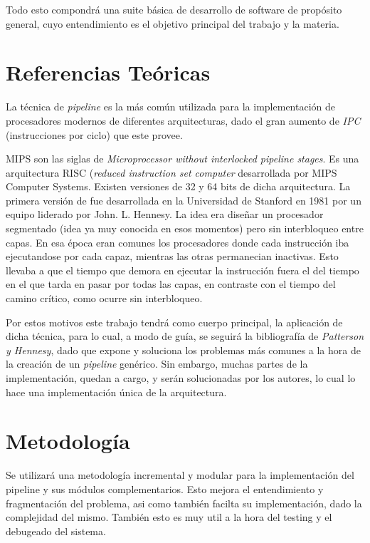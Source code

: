 \documentclass[12pt]{article}
\begin{document}
Todo esto compondrá una suite básica de desarrollo de software de propósito general, cuyo entendimiento es el objetivo principal del trabajo y la materia.


\section{Referencias Teóricas} \label{sec:firstpage}

La técnica de \textit{pipeline} es la más común utilizada para la implementación de procesadores modernos de diferentes arquitecturas, dado el gran aumento de \textit{IPC} (instrucciones por ciclo) que este provee.

MIPS son las siglas de \textit{Microprocessor without interlocked pipeline stages}. Es una arquitectura RISC (\textit{reduced instruction set computer} desarrollada por MIPS Computer Systems. Existen versiones de 32 y 64 bits de dicha arquitectura. La primera versión de fue desarrollada en la Universidad de Stanford en 1981 por un equipo liderado por John. L. Hennesy. La idea era diseñar un procesador segmentado (idea ya muy conocida en esos momentos) pero sin interbloqueo entre capas. En esa época eran comunes los procesadores donde cada instrucción iba ejecutandose por cada capaz, mientras las otras permanecian inactivas. Esto llevaba a que el tiempo que demora en ejecutar la instrucción fuera el del tiempo en el que tarda en pasar por todas las capas, en contraste con el tiempo del camino crítico, como ocurre sin interbloqueo.

Por estos motivos este trabajo tendrá como cuerpo principal, la aplicación de dicha técnica, para lo cual, a modo de guía, se seguirá la bibliografía de \textit{Patterson y Hennesy}, dado que expone y soluciona los problemas más comunes a la hora de la creación de un \textit{pipeline} genérico. Sin embargo, muchas partes de la implementación, quedan a cargo, y serán solucionadas por los autores, lo cual lo hace una implementación única de la arquitectura.

\section{Metodología}

Se utilizará una metodología incremental y modular para la implementación del pipeline y sus módulos complementarios. Esto mejora el entendimiento y fragmentación del problema, asi como también facilta su implementación, dado la complejidad del mismo. También esto es muy util a la hora del testing y el debugeado del sistema.
\end{document}

